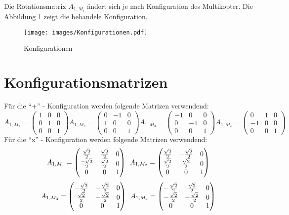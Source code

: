 Die Rotationsmatrix $A_{1, M_i}$ ändert sich je nach Konfiguration des Multikopter. Die Abbildung \ref{fig:Konfigurationen} zeigt die behandele Konfiguration.
\begin{figure}[ht]
  \centering
  \texttt{[image: images/Konfigurationen.pdf]}
  \caption{Konfigurationen}
  \label{fig:Konfigurationen}
\end{figure}
\section{Konfigurationsmatrizen}\label{sec:konfg_matrix}
Für die ``+'' - Konfiguration werden folgende Matrizen verwendend:
\[
  A_{1, M_1} = \begin{pmatrix} 1 & 0 & 0 \\ 0 & 1 & 0 \\ 0 & 0 & 1 \end{pmatrix}
  A_{1, M_2} = \begin{pmatrix} 0 & -1 & 0 \\ 1 & 0 & 0 \\ 0 & 0 & 1 \end{pmatrix}
  A_{1, M_3} = \begin{pmatrix} -1 & 0 & 0 \\ 0 & -1 & 0 \\ 0 & 0 & 1 \end{pmatrix} 
  A_{1, M_4} = \begin{pmatrix} 0 & 1 & 0 \\ -1 & 0 & 0 \\ 0 & 0 & 1 \end{pmatrix}
\]
Für die ``x'' - Konfiguration werden folgende Matrizen verwendend:
\[
  A_{1, M_1} = \begin{pmatrix} \frac{\sqrt{2}}{2} & \frac{\sqrt{2}}{2} & 0 \\ \frac{-\sqrt{2}}{2} & \frac{\sqrt{2}}{2} & 0 \\ 0 & 0 & 1 \end{pmatrix} \hspace{0.5em}
  A_{1, M_2} = \begin{pmatrix} \frac{\sqrt{2}}{2} & -\frac{\sqrt{2}}{2} & 0 \\ \frac{\sqrt{2}}{2} & \frac{\sqrt{2}}{2} & 0 \\ 0 & 0 & 1 \end{pmatrix}
\]
\[
  A_{1, M_3} = \begin{pmatrix} -\frac{\sqrt{2}}{2} & -\frac{\sqrt{2}}{2} & 0 \\ \frac{\sqrt{2}}{2} & -\frac{\sqrt{2}}{2} & 0 \\ 0 & 0 & 1 \end{pmatrix} \hspace{0.5em}
  A_{1, M_4} = \begin{pmatrix} -\frac{\sqrt{2}}{2} & \frac{\sqrt{2}}{2} & 0 \\ -\frac{\sqrt{2}}{2} & -\frac{\sqrt{2}}{2} & 0 \\ 0 & 0 & 1 \end{pmatrix}
\]
